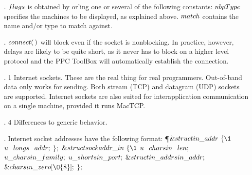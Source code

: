 . \CD{}$\\{flags}$\DC{} is obtained by or'ing one or several of the
following constants:
\medskip{}
\medskip
\CD{}$\\{nbpType}$\DC{} specifies the machines to be displayed, as explained
above. \CD{}$\\{match}$\DC{} contains the name
and/or type to match against.

\fi

. \CD{}$\\{connect}(\,)$\DC{} will block even if the socket is
nonblocking. In practice, however,
delays are likely to be quite short, as it never has to block on a higher level
protocol and the PPC ToolBox will automatically establish the connection.

\fi

. 1 Internet sockets. These are the real thing for real programmers.
Out-of-band
data only works for sending. Both stream (TCP) and datagram (UDP) sockets are
supported. Internet sockets are also suited for interapplication communication
on a single machine, provided it runs MacTCP.

\fi

. 4 Differences to generic behavior.

\fi

. Internet socket addresses have the following format:
\Y\P $\&{struct}\ \\{in\_addr}\ \{\1$\6
$\\{u\_long}\ \\{s\_addr};$\2\6
$\};$\7
$\&{struct}\ \\{sockaddr\_in}\ \{\1$\6
$\\{u\_char}\ \\{sin\_len};$\5
\6
$\\{u\_char}\ \\{sin\_family};$\5
\6
$\\{u\_short}\ \\{sin\_port};$\5
\6
$\&{struct}\ \\{in\_addr}\ \\{sin\_addr};$\5
\6
$\&{char}\ \\{sin\_zero}[\O{8}];$\2\6
$\};$\par
\fi

